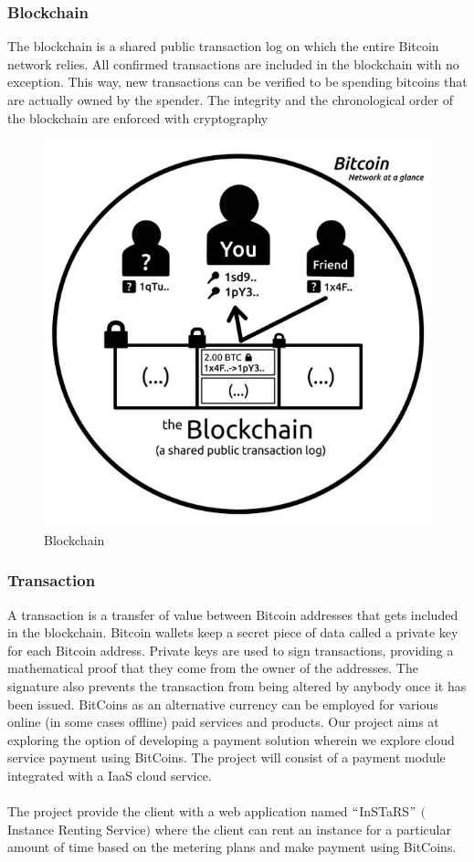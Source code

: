 \documentclass[a4page,12pt]{article}
\begin{document}
\subsubsection{Blockchain}
The blockchain is a shared public transaction log on which the entire Bitcoin network relies. All confirmed transactions are included in the blockchain with no exception. This way, new transactions can be verified to be spending bitcoins that are actually owned by the spender. The integrity and the chronological order of the blockchain are enforced with cryptography
\begin{center}
\begin{figure}[htbp]
\includegraphics[scale=0.4]{images/bloackchain.jpg}
\caption{Blockchain}
\end{figure}
\end{center}
\subsubsection{Transaction}
A transaction is a transfer of value between Bitcoin addresses that gets included in the blockchain. Bitcoin wallets keep a secret piece of data called a private key for each Bitcoin address. Private keys are used to sign transactions, providing a mathematical proof that they come from the owner of the addresses. The signature also prevents the transaction from being altered by anybody once it has been issued.
BitCoins as an alternative currency can be employed for various online (in some cases offline) paid services and products. Our project aims at exploring the option of developing a payment solution wherein we explore cloud service payment using BitCoins. The project will consist of a payment module integrated with a IaaS cloud service.\\\\
The project provide the client with a web application named $``$InSTaRS$"$ $($Instance Renting Service$)$ where the client can rent an instance for a particular amount of time based on the metering plans and make payment using BitCoins.
\end{document}
